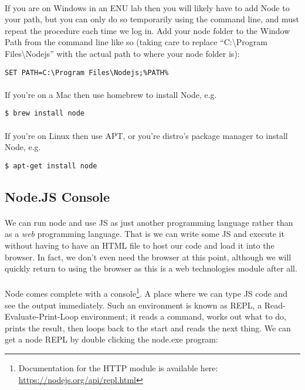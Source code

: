 \documentclass[10pt, a4paper, twosize]{article}
\begin{document}
\paragraph{} If you are on Windows in an ENU lab then you will likely have to add Node to your path, but you can only do so temporarily using the command line, and must repeat the procedure each time we log in. Add your node folder to the Window Path from the command line like so (taking care to replace ``C:\textbackslash Program Files\textbackslash Nodejs'' with the actual path to where your node folder is):

\begin{lstlisting}[style=DOS]
SET PATH=C:\Program Files\Nodejs;%PATH%
\end{lstlisting}

\paragraph{} If you're on a Mac then use homebrew to install Node, e.g.

\begin{lstlisting}[style=DOS]
$ brew install node
\end{lstlisting}

\paragraph{} If you're on Linux then use APT, or you're distro's package manager to install Node, e.g.

\begin{lstlisting}[style=DOS]
$ apt-get install node
\end{lstlisting}


\subsection{Node.JS Console}
\paragraph{} We can run node and use JS as just another programming language rather than as a \emph{web} programming language. That is we can write some JS and execute it without having to have an HTML file to host our code and load it into the browser. In fact, we don't even need the browser at this point, although we will quickly return to using the browser as this is a web technologies module after all.

\paragraph{} Node comes complete with a console\footnote{Documentation for the HTTP module is available here: \url{https://nodejs.org/api/repl.html}}. A place where we can type JS code and see the output immediately. Such an environment is known as REPL, a Read-Evaluate-Print-Loop environment; it reads a command, works out what to do, prints the result, then loops back to the start and reads the next thing. We can get a node REPL by double clicking the node.exe program:\\
\end{document}
